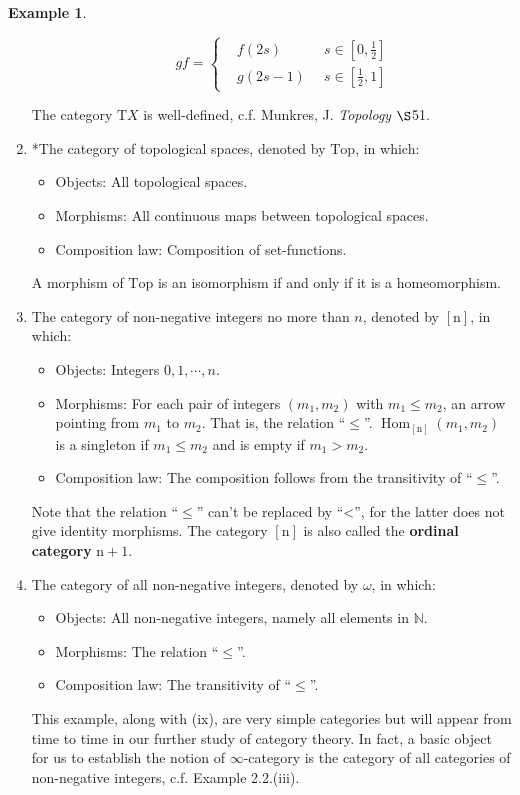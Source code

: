 \documentclass{article}
\theoremstyle{definition}
\theoremstyle{definition}
\newtheorem{example}{Example}[section]
\theoremstyle{remark}
\DeclareMathOperator{\Hom}{Hom}
\begin{document}
\begin{example}
\begin{enumerate}[label=(\roman*)]
\begin{itemize}
			\[gf=\left\{
				\begin{aligned}
					&f(2s)\ \ \ \ \ \ \ \ \ \  &s\in[0,\frac{1}{2}]\\
					&g(2s-1)&s\in[\frac{1}{2},1]
				\end{aligned}
			\right.
			\]
		\end{itemize}
	The category $\mathrm{T}X$ is well-defined, c.f. Munkres, J. \textsl{Topology} $\S$51.
	\item *The category of topological spaces, denoted by $\mathrm{Top}$, in which:
		\begin{itemize}
			\item Objects: All topological spaces.
			\item Morphisms: All continuous maps between topological spaces.
			\item Composition law: Composition of set-functions.
		\end{itemize}
	A morphism of $\mathrm{Top}$ is an isomorphism if and only if it is a homeomorphism.
	\item The category of non-negative integers no more than $n$, denoted by $[\mathrm{n}]$, in which:
	 	\begin{itemize}
	 		\item Objects: Integers $0,1,\cdots,n$.
	 		\item Morphisms: For each pair of integers $(m_1,m_2)$ with $m_1\leq m_2$, an arrow pointing from $m_1$ to $m_2$. That is, the relation ``$\leq$''. $\Hom_{[\mathrm{n}]}(m_1,m_2)$ is a singleton if $m_1\leq m_2$ and is empty if $m_1>m_2$.
	 		\item Composition law: The composition follows from the transitivity of ``$\leq$''. 
	 	\end{itemize}
	Note that the relation ``$\leq$'' can't be replaced by ``<'', for the latter does not give identity morphisms. The category $[\mathrm{n}]$ is also called the \textbf{ordinal category} $\mathrm{n+1}$.
	\item The category of all non-negative integers, denoted by $\omega$, in which:
		\begin{itemize}
			\item Objects: All non-negative integers, namely all elements in $\mathbb{N}$.
			\item Morphisms: The relation ``$\leq$''.
			\item Composition law: The transitivity of ``$\leq$''.
		\end{itemize}
	This example, along with (ix), are very simple categories but will appear from time to time in our further study of category theory. In fact, a basic object for us to establish the notion of $\infty$-category is the category of all categories of non-negative integers, c.f. Example 2.2.(iii).
	\end{enumerate}
	\end{example}
\end{document}

